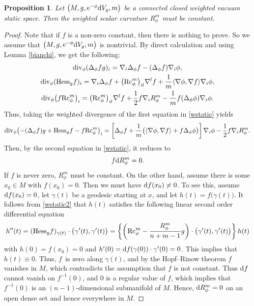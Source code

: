 \documentclass[10pt,a4paper]{amsart}
\numberwithin{equation}{section}
\newtheorem{Proposition}[Theorem]{Proposition}
 { \theoremstyle{definition}
\newtheorem{Definition}[Theorem]{Definition}
\newtheorem{Note}[Theorem]{Note}
\newtheorem{Example}[Theorem]{Example}
\newtheorem{Remark}[Theorem]{Remark} }
\begin{document}
\begin{Proposition}\label{Rphiconst}
 Let $\bigl(M,g,{\rm e}^{-\phi}{\rm d}V_g,m\bigr)$ be a connected closed weighted vacuum static space. Then
 the weighted scalar curvature $R_\phi^m$ must be constant.
\end{Proposition}
\begin{proof}
 Note that if $f$ is a non-zero constant, then there is nothing to prove. So we assume that $\bigl(M,g,{\rm e}^{-\phi}{\rm d}V_g,m\bigr)$ is nontrivial. By direct calculation and using Lemma \ref{bianchi}, we get the following:
 \begin{gather*}
 {\rm div}_\phi(\Delta_\phi fg)_i=\nabla_i\Delta_\phi f-(\Delta_\phi f)\nabla_i \phi,\\
 {\rm div}_\phi({\rm Hess}_gf)_i=\nabla_i\Delta_\phi f+\bigl({\rm Rc}_\phi^m\bigr)_{il}\nabla^lf+\frac{1}{m}\langle \nabla \phi,\nabla f\rangle \nabla_i\phi,\\
 {\rm div}_\phi\bigl(f{\rm Rc}_\phi^m\bigr)_i=\bigl({\rm Rc}_\phi^m\bigr)_{il}\nabla^lf+\frac{1}{2}f \nabla_iR_\phi^m-\frac{1}{m}f(\Delta_\phi\phi) \nabla_i\phi.
 \end{gather*}
Thus, taking the weighted divergence of the first equation in \eqref{wstatic} yields
\begin{gather*}
 {\rm div}_\phi\bigl(-(\Delta_\phi f)g+{\rm Hess}_gf-f{\rm Rc}_\phi^m\bigr)_i
 =\left[\Delta_\phi f+\frac{1}{m}\bigl(\langle \nabla \phi,\nabla f\rangle+f\Delta_\phi\phi\bigr)\right]\nabla_i\phi-\frac{1}{2}f\nabla_iR_\phi^m.
\end{gather*}
Then, by the second equation in \eqref{wstatic}, it reduces to
\begin{equation*}
 f{\rm d}R_\phi^m=0.
\end{equation*}
If $f$ is never zero, $R_\phi^m$ must be constant. On the other hand, assume there is some $x_0\in M$ with $f(x_0)=0$. Then we must have ${\rm d}f(x_0)\neq0$. To see this, assume ${\rm d}f(x_0)=0$, let $\gamma(t)$ be a geodesic starting at $x$, and let $h(t)=f\bigl(\gamma(t)\bigr)$. It follows from \eqref{wstatic2}
that $h(t)$ satisfies the following linear second order differential equation
\begin{gather*}
 h''(t)=({\rm Hess}_gf)_{\gamma(t)}\cdot\bigl(\gamma'(t),\gamma'(t)\bigr)
 =\left\{\left({\rm Rc}_\phi^m-\frac{R_\phi^m}{n+m-1}g\right)\cdot\bigl(\gamma'(t),\gamma'(t)\bigr)\right\}h(t)
\end{gather*}
with $h(0)=f(x_0)=0$ and $h'(0)={\rm d}f(\gamma(0))\cdot \gamma'(0)=0$. This implies that $h(t)\equiv 0$. Thus, $f$~is zero along $\gamma(t)$, and by the Hopf--Rinow theorem $f$ vanishes in $M$, which contradicts the assumption that $f$ is not constant.
 Thus ${\rm d}f$ cannot vanish on $f^{-1}(0)$, and $0$ is a regular value of $f$,
 which implies that $f^{-1}(0)$ is an $(n-1)$-dimensional submanifold of $M$. Hence, ${\rm d}R_\phi^m=0$ on an open dense set and hence everywhere in $M$.
\end{proof}
\end{document}
